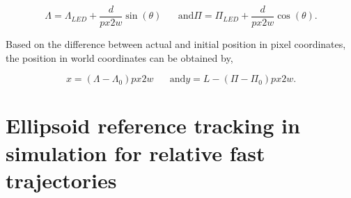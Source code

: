 \begin{equation}
    \Lambda = \Lambda_{LED} + \frac{d}{px2w} \sin(\theta) \hspace{20pt} \text{and}    \Pi = \Pi_{LED} + \frac{d}{px2w} \cos(\theta).
\end{equation}

Based on the difference between actual and initial position in pixel coordinates, the position in world coordinates can be obtained by, 

\begin{equation}
    x = (\Lambda-\Lambda_0)px2w \hspace{20pt} \text{and} y = L - (\Pi - \Pi_0)px2w. 
\end{equation}










\section{Ellipsoid reference tracking in simulation for relative fast trajectories}


